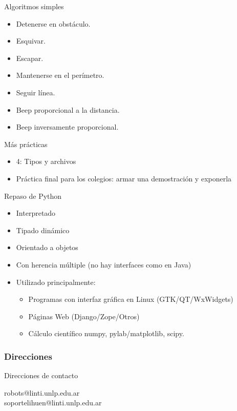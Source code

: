 \documentclass{beamer}[10]
\begin{document}
\begin{frame}{Algoritmos simples}
	\begin{itemize}[<+->]
		\item Detenerse en obstáculo.
		\item Esquivar.
		\item Escapar.
		\item Mantenerse en el perímetro.
		\item Seguir línea.
		\item Beep proporcional a la distancia.
		\item Beep inversamente proporcional.
	\end{itemize}
\end{frame}
\begin{frame}{Más prácticas}
	\begin{itemize}
		\item 4: Tipos y archivos
		\item Práctica final para los colegios: armar una demostración y exponerla
	\end{itemize}
\end{frame}
\begin{frame}{Repaso de Python}
	\begin{itemize}[<+->]
		\item Interpretado
		\item Tipado dinámico
		\item Orientado a objetos
		\item Con herencia múltiple (no hay interfaces como en Java)
		\item Utilizado principalmente:
		\begin{itemize}
			\item Programas con interfaz gráfica en Linux (GTK/QT/WxWidgets)
			\item Páginas Web (Django/Zope/Otros)
			\item Cálculo científico numpy, pylab/matplotlib, scipy.
		\end{itemize}
	\end{itemize}
\end{frame}
\frame
{
\frametitle{Direcciones}

\begin{block}{Direcciones de contacto}
\begin{center}
robots@linti.unlp.edu.ar \\
soportelihuen@linti.unlp.edu.ar
\end{center}
\end{block}

}
\end{document}

